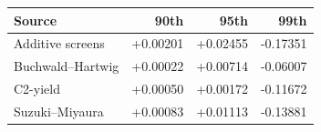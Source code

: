 \begin{tabular}{lrrr}
\toprule
Source & 90th & 95th & 99th\\
\midrule
Additive screens & +0.00201 & +0.02455 & -0.17351\\
Buchwald--Hartwig & +0.00022 & +0.00714 & -0.06007\\
C2-yield & +0.00050 & +0.00172 & -0.11672\\
Suzuki--Miyaura & +0.00083 & +0.01113 & -0.13881\\
\bottomrule
\end{tabular}
